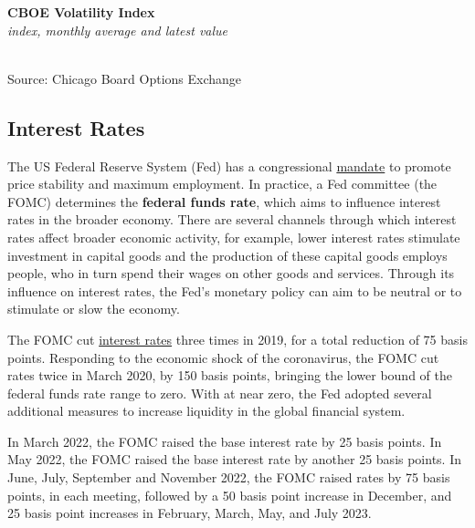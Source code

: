 \documentclass{report}
\makeatletter
\newcommand{\tbllink}[1]{\href{https://raw.githubusercontent.com/bdecon/US-chartbook/master/chartbook/data/#1}{\faTable}}
\newcommand*\short[1]{\expandafter\@gobbletwo\number\numexpr#1\relax}
\newcommand{\dateaxisticks}{
		date coordinates in=x, axis line style={draw=none},
		xmax={2023-10-01},
		max space between ticks=40,	    
		xtick={{1990-01-01}, {1992-01-01}, {1994-01-01}, 
			{1996-01-01}, {1998-01-01}, {2000-01-01}, 
			{2002-01-01}, {2004-01-01}, {2006-01-01},
			{2008-01-01}, {2010-01-01}, {2012-01-01}, {2014-01-01},
		    {2016-01-01}, {2018-01-01}, {2020-01-01}, {2022-01-01}, 
		    {2024-01-01}, {2026-01-01}},
		minor xtick={{1989-01-01}, {1991-01-01}, {1993-01-01},
			{1995-01-01}, {1997-01-01}, {1999-01-01}, 
			{2001-01-01}, {2003-01-01}, {2005-01-01}, {2007-01-01},
		    {2009-01-01}, {2011-01-01}, {2013-01-01}, {2015-01-01},
		    {2017-01-01}, {2019-01-01}, {2021-01-01}, {2023-01-01}, 
		    {2025-01-01}, {2027-01-01}},
		enlarge y limits={0.06}, enlarge x limits={0.01},
		}
\newcommand{\bbar}[2]{extra #1 ticks = {{#2}}, extra #1 tick labels = ,
		extra #1 tick style = {grid=major, grid style={thick, black!25}},}
\newcommand{\stdline}[4]{\addplot[very thick, no markers, color=#1] 
		table [x=#2, y=#3, col sep=comma] {#4};	}
\newcommand{\rbars}{
		\fill[color=black!10] (axis cs:{1990-07-01},\pgfkeysvalueof{/pgfplots/ymin}) rectangle 
			(axis cs:{1991-03-01}, \pgfkeysvalueof{/pgfplots/ymax});
		\fill[color=black!10] (axis cs:{2007-12-01},\pgfkeysvalueof{/pgfplots/ymin}) rectangle 
			(axis cs:{2009-07-01}, \pgfkeysvalueof{/pgfplots/ymax});
		\fill[color=black!10] (axis cs:{2001-03-01},\pgfkeysvalueof{/pgfplots/ymin}) rectangle 
			(axis cs:{2001-11-01}, \pgfkeysvalueof{/pgfplots/ymax});
		\fill[color=black!10] (axis cs:{2020-02-01},\pgfkeysvalueof{/pgfplots/ymin}) rectangle 
			(axis cs:{2020-05-01}, \pgfkeysvalueof{/pgfplots/ymax});}
\makeatother
\begin{document}
{\begin{minipage}{0.76\textwidth}
\normalsize \textbf{CBOE Volatility Index}\\
\footnotesize{\textit{index, monthly average and latest value}}\\
\hspace*{-2mm} \\
\footnotesize{Source: Chicago Board Options Exchange} \hfill \tbllink{vix.csv}
\end{minipage}
\newpage
\begin{minipage}{0.76\textwidth}    
\subsection*{Interest Rates}
\hypertarget{capint}{\label{capint}}
\small The US Federal Reserve System (Fed) has a congressional \href{https://www.federalreserve.gov/faqs/money_12848.htm}{mandate} to promote price stability and maximum employment. In practice, a Fed committee (the FOMC) determines the \textbf{federal funds rate}, which aims to influence interest rates in the broader economy. There are several channels through which interest rates affect broader economic activity, for example, lower interest rates stimulate investment in capital goods and the production of these capital goods employs people, who in turn spend their wages on other goods and services. Through its influence on interest rates, the Fed's monetary policy can aim to be neutral or to stimulate or slow the economy.

The FOMC cut \href{https://www.federalreserve.gov/releases/h15/}{interest rates} three times in 2019, for a total reduction of 75 basis points. Responding to the economic shock of the coronavirus, the FOMC cut rates twice in March 2020, by 150 basis points, bringing the lower bound of the federal funds rate range to zero. With at near zero, the Fed adopted several additional measures to increase liquidity in the global financial system.

In March 2022, the FOMC raised the base interest rate by 25 basis points. In May 2022, the FOMC raised the base interest rate by another 25 basis points. In June, July, September and November 2022, the FOMC raised rates by 75 basis points, in each meeting, followed by a 50 basis point increase in December, and 25 basis point increases in February, March, May, and July 2023. 
\vspace{2mm}


\end{minipage}}
\end{document}
